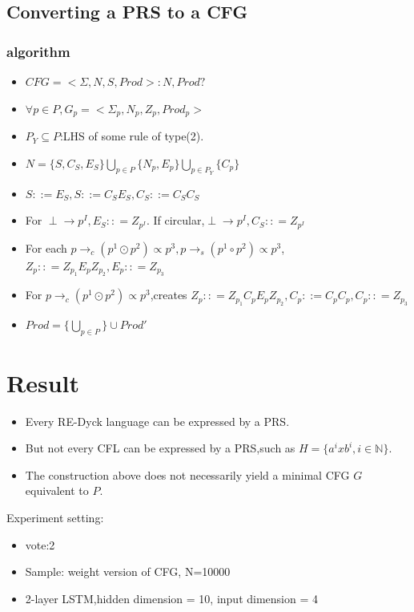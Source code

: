\documentclass[aspectratio=169%
,serif,mathserif]{beamer}
\begin{document}
\subsection{Converting a PRS to a CFG}
\begin{frame}
	\frametitle{algorithm}	
		\begin{itemize}
			\item $CFG = <\Sigma,N,S,Prod>:N,Prod?$
			\item $\forall p \in P, G_p = <\Sigma_p,N_p,Z_p,Prod_p>$
			\item $P_Y \subseteq P$:LHS of some rule of type(2).
			\item $N = \{S,C_S,E_S\} \bigcup\limits_{p \in P}\{N_p,E_p\}\bigcup\limits_{p \in P_Y}\{C_p\}$
			\item $S ::= E_S, S ::= C_SE_S,C_S::= C_SC_S$
			\item For $\perp \rightarrow p^{I}, E_S:: = Z_{p^I}$. If circular,$\perp \rightarrow p^{I}, C_S:: = Z_{p^I}$
			\item For each $p \rightarrow_{c}\left(p^{1} \odot p^{2}\right) \propto p^{3},p \rightarrow_{s}\left(p^{1} \circ p^{2}\right) \propto p^{3}$,$Z_p:: = Z_{p_1}E_pZ_{p_2},E_p:: = Z_{p_3}$
			\item For $p \rightarrow_{c}\left(p^{1} \odot p^{2}\right) \propto p^{3}$,creates $Z_p:: = Z_{p_1}C_pE_pZ_{p_2}, C_p::= C_pC_p, C_p:: = Z_{p_3}$
			\item $Prod =\{\bigcup\limits_{p \in P}\} \cup Prod'$  
		\end{itemize}	
\end{frame}

\section{Result}
\begin{frame}
	\begin{itemize}
		\item Every RE-Dyck language can be expressed by a PRS.
		\item But not every CFL can be expressed by a PRS,such as $H = \{a^ixb^i,i \in \mathbb{N}\}$.
		\item The construction above does not necessarily yield a minimal CFG $G$ equivalent to $P$.
	\end{itemize}

	Experiment setting:
	\begin{itemize}
		\item vote:2
		\item Sample: weight version of CFG, N=10000
		\item 2-layer LSTM,hidden dimension = 10, input dimension = 4
	\end{itemize}
\end{frame}
\end{document}
